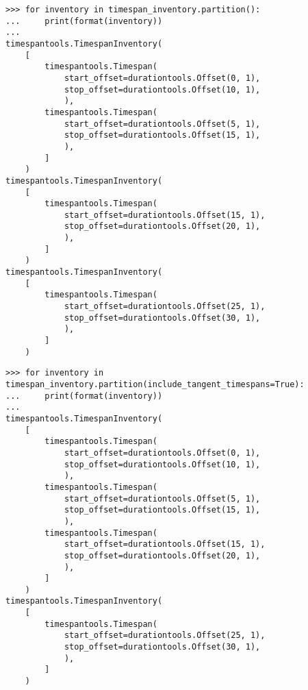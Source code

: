 \begin{singlespacing}
\begin{lstlisting}
>>> for inventory in timespan_inventory.partition():
...     print(format(inventory))
...
timespantools.TimespanInventory(
    [
        timespantools.Timespan(
            start_offset=durationtools.Offset(0, 1),
            stop_offset=durationtools.Offset(10, 1),
            ),
        timespantools.Timespan(
            start_offset=durationtools.Offset(5, 1),
            stop_offset=durationtools.Offset(15, 1),
            ),
        ]
    )
timespantools.TimespanInventory(
    [
        timespantools.Timespan(
            start_offset=durationtools.Offset(15, 1),
            stop_offset=durationtools.Offset(20, 1),
            ),
        ]
    )
timespantools.TimespanInventory(
    [
        timespantools.Timespan(
            start_offset=durationtools.Offset(25, 1),
            stop_offset=durationtools.Offset(30, 1),
            ),
        ]
    )
\end{lstlisting}
\end{singlespacing}

\begin{comment}
<abjad>
for inventory in timespan_inventory.partition(include_tangent_timespans=True):
    print(format(inventory))

</abjad>
\end{comment}

\begin{singlespacing}
\begin{lstlisting}
>>> for inventory in timespan_inventory.partition(include_tangent_timespans=True):
...     print(format(inventory))
...
timespantools.TimespanInventory(
    [
        timespantools.Timespan(
            start_offset=durationtools.Offset(0, 1),
            stop_offset=durationtools.Offset(10, 1),
            ),
        timespantools.Timespan(
            start_offset=durationtools.Offset(5, 1),
            stop_offset=durationtools.Offset(15, 1),
            ),
        timespantools.Timespan(
            start_offset=durationtools.Offset(15, 1),
            stop_offset=durationtools.Offset(20, 1),
            ),
        ]
    )
timespantools.TimespanInventory(
    [
        timespantools.Timespan(
            start_offset=durationtools.Offset(25, 1),
            stop_offset=durationtools.Offset(30, 1),
            ),
        ]
    )
\end{lstlisting}
\end{singlespacing}

